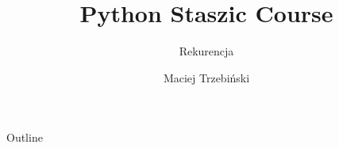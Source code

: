 \documentclass[aspectratio=43,english]{beamer}
\title{Python Staszic Course}
\subtitle{Rekurencja}
\author{Maciej Trzebiński}
\date{}
\begin{document}
    \maketitle

    \begin{frame}{Outline}
        \tableofcontents
    \end{frame}

    

    
\end{document}
